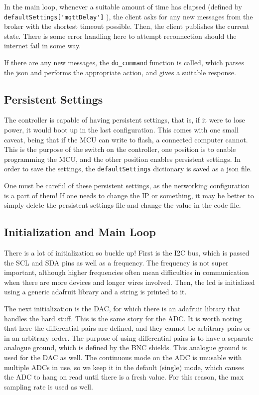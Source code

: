 \documentclass[11pt, letterpaper]{article}
\begin{document}
In the main loop, whenever a suitable amount of time has elapsed (defined by \verb|defaultSettings['mqttDelay']| ), the client asks for any new messages from the broker with the shortest timeout possible. Then, the client publishes the current state. There is some error handling here to attempt reconnection should the internet fail in some way.

If there are any new messages, the \verb|do_command| function is called, which parses the json and performs the appropriate action, and gives a suitable response.

\subsection{Persistent Settings}
The controller is capable of having persistent settings, that is, if it were to lose power, it would boot up in the last configuration. This comes with one small caveat, being that if the MCU can write to flash, a connected computer cannot. This is the purpose of the switch on the controller, one position is to enable programming the MCU, and the other position enables persistent settings. In order to save the settings, the \verb|defaultSettings| dictionary is saved as a json file.

One must be careful of these persistent settings, as the networking configuration is a part of them! If one needs to change the IP or something, it may be better to simply delete the persistent settings file and change the value in the code file.

\subsection{Initialization and Main Loop}
There is a lot of initialization so buckle up! First is the I2C bus, which is passed the SCL and SDA pins as well as a frequency. The frequency is not super important, although higher frequencies often mean difficulties in communication when there are more devices and longer wires involved. Then, the lcd is initialized using a generic adafruit library and a string is printed to it. 

The next initialization is the DAC, for which there is an adafruit library that handles the hard stuff. This is the same story for the ADC. It is worth noting that here the differential pairs are defined, and they cannot be arbitrary pairs or in an arbitrary order. The purpose of using differential pairs is to have a separate analogue ground, which is defined by the BNC shields. This analogue ground is used for the DAC as well. The continuous mode on the ADC is unusable with multiple ADCs in use, so we keep it in the default (single) mode, which causes the ADC to hang on read until there is a fresh value. For this reason, the max sampling rate is used as well.
\end{document}
